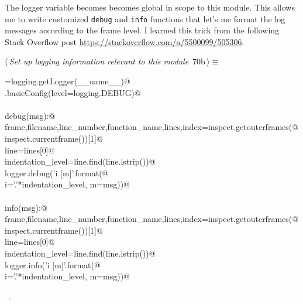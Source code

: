 \documentclass[11.5pt]{report}
\begin{document}
\vspace{-0.8cm}\newchunk The logger variable becomes becomes global in scope to this module. This allows
me to write customized \texttt{debug} and \texttt{info} functions that let's me format 
the log messages according to the frame level. I learned this trick from the following 
Stack Overflow post \url{https://stackoverflow.com/a/5500099/505306}. 
\begin{flushleft} \small
\begin{minipage}{\linewidth}\label{scrap101}\raggedright\small
{} $\langle\,${\itshape Set up logging information relevant to this module}\nobreak\ {\footnotesize {70b}}$\,\rangle\equiv$
\vspace{-1ex}
\begin{list}{}{} \item
\mbox{}\verb@logger=logging.getLogger(__name__)@\\
\mbox{}\verb@logging.basicConfig(level=logging.DEBUG)@\\
\mbox{}\verb@@\\
\mbox{}\verb@def debug(msg):@\\
\mbox{}\verb@    frame,filename,line_number,function_name,lines,index=inspect.getouterframes(@\\
\mbox{}\verb@        inspect.currentframe())[1]@\\
\mbox{}\verb@    line=lines[0]@\\
\mbox{}\verb@    indentation_level=line.find(line.lstrip())@\\
\mbox{}\verb@    logger.debug('{i} [{m}]'.format(@\\
\mbox{}\verb@        i='.'*indentation_level, m=msg))@\\
\mbox{}\verb@@\\
\mbox{}\verb@def info(msg):@\\
\mbox{}\verb@    frame,filename,line_number,function_name,lines,index=inspect.getouterframes(@\\
\mbox{}\verb@        inspect.currentframe())[1]@\\
\mbox{}\verb@    line=lines[0]@\\
\mbox{}\verb@    indentation_level=line.find(line.lstrip())@\\
\mbox{}\verb@    logger.info('{i} [{m}]'.format(@\\
\mbox{}\verb@        i='.'*indentation_level, m=msg))@\\
\mbox{}\verb@@{\NWsep}
\end{list}
\vspace{-1.5ex}
\footnotesize
\begin{list}{}{\setlength{\itemsep}{-\parsep}\setlength{\itemindent}{-\leftmargin}}
\item \NWtxtMacroRefIn\ .

\item{}
\end{list}
\end{minipage}\vspace{4ex}
\end{flushleft}
\end{document}
